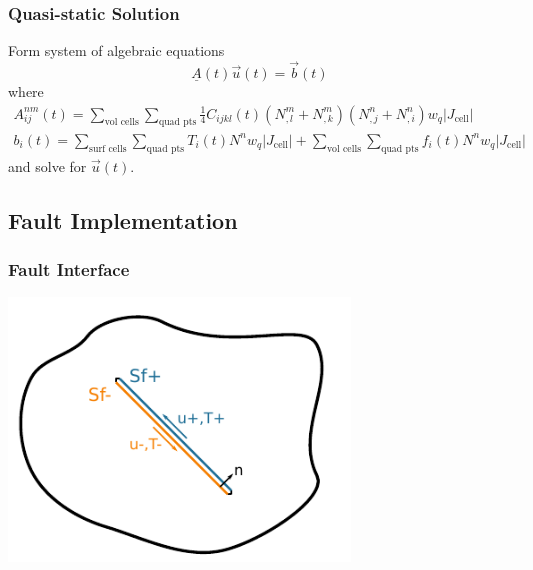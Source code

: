 \documentclass{beamer}
\begin{document}
\begin{frame}
  \frametitle{Quasi-static Solution}

  \vfill
  Form system of algebraic equations
  \begin{equation}
    \underline{A} (t) \vec{u}(t) = \vec{b}(t)
  \end{equation}
  where
  \begin{gather}
    A^{nm}_{ij}(t) = \sum_\text{vol cells} \sum_\text{quad pts} 
      \frac{1}{4} C_{ijkl}(t) (N^m_{,l} + N^m_{,k})(N^n_{,j} + N^n_{,i}) w_q |J_\text{cell}| \\
    b_i(t) =    
     \sum_\text{surf cells} \sum_\text{quad pts} T_i(t) N^n w_q |J_\text{cell}| 
    + \sum_\text{vol cells} \sum_\text{quad pts}  f_i(t) N^n w_q |J_\text{cell}|
\end{gather}
  and solve for $\vec{u}(t)$.
  \vfill


\end{frame}


\subsection{Fault Implementation}

\begin{frame}[fragile]
  \frametitle{Fault Interface}

  \begin{center}
    \includegraphics[height=7.0cm]{figs/domaindecomp}
  \end{center}

\end{frame}
\end{document}
